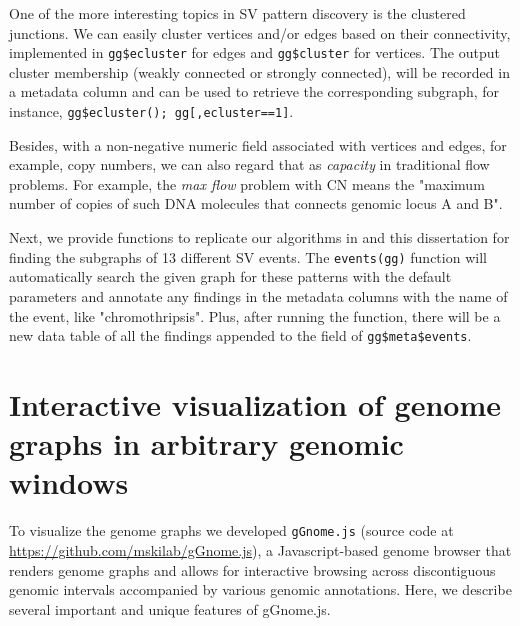 \documentclass[phd,tocprelim]{cornell}
\begin{document}
One of the more interesting topics in SV pattern discovery is the clustered junctions. We can easily cluster vertices and/or edges based on their connectivity, implemented in \texttt{gg\$ecluster} for edges and \texttt{gg\$cluster} for vertices. The output cluster membership (weakly connected or strongly connected), will be recorded in a metadata column and can be used to retrieve the corresponding subgraph, for instance, \texttt{gg\$ecluster(); gg[,ecluster==1]}.

Besides, with a non-negative numeric field associated with vertices and edges, for example, copy numbers, we can also regard that as \textit{capacity} in traditional flow problems. For example, the \textit{max flow} problem with CN means the "maximum number of copies of such DNA molecules that connects genomic locus A and B".

Next, we provide functions to replicate our algorithms in \cite{Hadi2020-um} and this dissertation for finding the subgraphs of 13 different SV events. The \texttt{events(gg)} function will automatically search the given graph for these patterns with the default parameters and annotate any findings in the metadata columns with the name of the event, like "chromothripsis". Plus, after running the function, there will be a new data table of all the findings appended to the field of \texttt{gg\$meta\$events}.

\section{Interactive visualization of genome graphs in arbitrary genomic windows}
To visualize the genome graphs we developed \texttt{gGnome.js} (source code at \url{https://github.com/mskilab/gGnome.js}), a Javascript-based genome browser that renders genome graphs and allows for interactive browsing across discontiguous genomic intervals accompanied by various genomic annotations. Here, we describe several important and unique features of gGnome.js.

\clearpage
\end{document}

